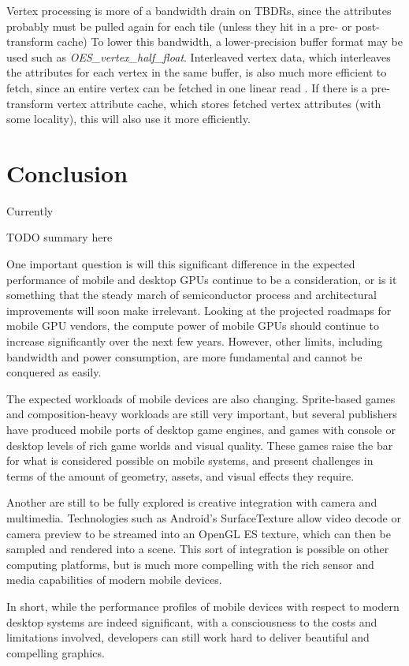 Vertex processing is more of a bandwidth drain on TBDRs, since the attributes
probably must be pulled again for each tile (unless they hit in a pre- or post-
transform cache)  To lower this bandwidth, a lower-precision buffer format may
be used such as \textit{OES\_vertex\_half\_float}.  Interleaved vertex data,
which interleaves the attributes for each vertex in the same buffer, is also
much more efficient to fetch, since an entire vertex can be fetched in one
linear read \cite{Apple11}.  If there is a pre-transform vertex attribute
cache, which stores fetched vertex attributes (with some locality), this will
also use it more efficiently.  

\section{Conclusion}\label{Jon-McCaffrey-Conclusion}

Currently

TODO summary here

One important question is will this significant difference in the expected
performance of mobile and desktop GPUs continue to be a consideration, or is it
something that the steady march of semiconductor process and architectural
improvements will soon make irrelevant.  Looking at the projected roadmaps for
mobile GPU vendors, the compute power of mobile GPUs should continue to
increase significantly over the next few years.  However, other limits,
including bandwidth and power consumption, are more fundamental and cannot be
conquered as easily.

The expected workloads of mobile devices are also changing.  Sprite-based games
and composition-heavy workloads are still very important, but several
publishers have produced mobile ports of desktop game engines, and games with
console or desktop levels of rich game worlds and visual quality.  These games
raise the bar for what is considered possible on mobile systems, and present
challenges in terms of the amount of geometry, assets, and visual effects they
require.

Another are still to be fully explored is creative integration with camera and
multimedia.  Technologies such as Android's SurfaceTexture allow video decode
or camera preview to be streamed into an OpenGL ES texture, which can then be
sampled and rendered into a scene.  This sort of integration is possible on
other computing platforms, but is much more compelling with the rich sensor and
media capabilities of modern mobile devices.

In short, while the performance profiles of mobile devices with respect to
modern desktop systems are indeed significant, with a consciousness to the
costs and limitations involved, developers can still work hard to deliver
beautiful and compelling graphics.

 











